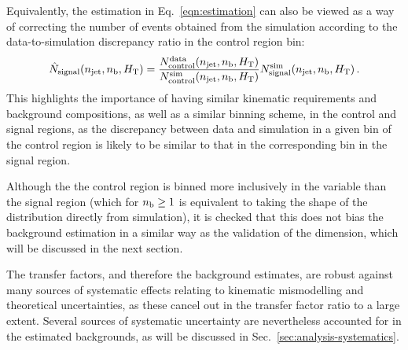 
Equivalently, the estimation in Eq.~\ref{eqn:estimation} can also be viewed as 
a way of correcting the number of events obtained from the simulation according 
to the data-to-simulation discrepancy ratio in the control region bin:
\begin{equation}
\label{eqn:estimation2}
\hat{N}_\mathrm{signal}(n_{\text{jet}}, n_{\text{b}}, \mbox{$H_\text{T}$}) = 
\frac{N_\mathrm{control}^\mathrm{data}(n_{\text{jet}}, n_{\text{b}}, \mbox{$H_\text{T}$})}{N_\mathrm{control}^\mathrm{sim}(n_{\text{jet}}, n_{\text{b}}, \mbox{$H_\text{T}$})}
N_\mathrm{signal}^\mathrm{sim}(n_{\text{jet}}, n_{\text{b}}, \mbox{$H_\text{T}$}) \, .
\end{equation}
This highlights the importance of having similar kinematic requirements and 
background compositions, as well as a similar binning scheme, in the control 
and signal regions, as the discrepancy between data and simulation in a given 
bin of the control region is likely to be similar to that in the corresponding 
bin in the signal region.

Although the the \mmj control region is binned more inclusively in the \nb 
variable than the signal region (which for $n_{\text{b}} \ge 1$ is equivalent to taking 
the shape of the \nb distribution directly from simulation), it is checked that 
this does not bias the background estimation in a similar way as the validation 
of the \mht dimension, which will be discussed in the next section.

The transfer factors, and therefore the background estimates, are robust 
against many sources of systematic effects relating to kinematic mismodelling 
and theoretical uncertainties, 
as these cancel out in the transfer factor ratio to a large extent.
Several sources of systematic uncertainty are nevertheless accounted for in the 
estimated backgrounds, as will be discussed in 
Sec.~\ref{sec:analysis-systematics}.

